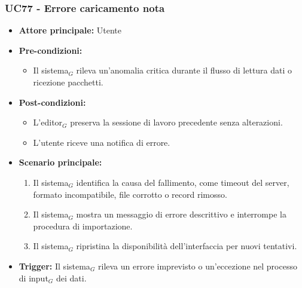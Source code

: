 \documentclass[a4paper, 10pt]{article}
\begin{document}
\subsubsection{UC77 - Errore caricamento nota}
\hypertarget{uc:77}{}
\begin{itemize}
    \item \textbf{Attore principale:} Utente
    \item \textbf{Pre-condizioni:} 
        \begin{itemize}
            \item Il sistema$_G$ rileva un'anomalia critica durante il flusso di lettura dati o ricezione pacchetti.
        \end{itemize}
    \item \textbf{Post-condizioni:} 
        \begin{itemize}
            \item L'editor$_G$ preserva la sessione di lavoro precedente senza alterazioni.
            \item L'utente riceve una notifica di errore.
        \end{itemize}
    \item \textbf{Scenario principale:}
        \begin{enumerate}
            \item Il sistema$_G$ identifica la causa del fallimento, come timeout del server, formato incompatibile, file corrotto o record rimosso.
            \item Il sistema$_G$ mostra un messaggio di errore descrittivo e interrompe la procedura di importazione.
            \item Il sistema$_G$ ripristina la disponibilità dell'interfaccia per nuovi tentativi.
        \end{enumerate}
    \item \textbf{Trigger:} Il sistema$_G$ rileva un errore imprevisto o un'eccezione nel processo di input$_G$ dei dati.
\end{itemize}
\end{document}
